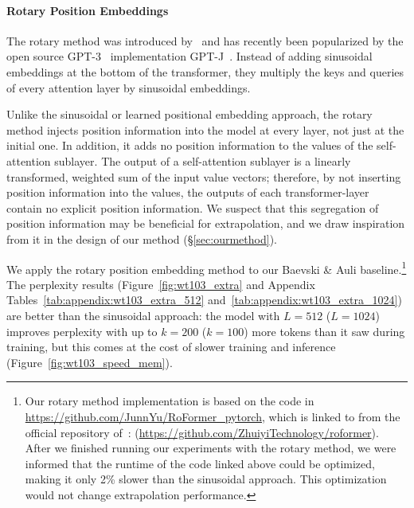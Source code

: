 \paragraph{Rotary Position Embeddings}
The rotary method was introduced by~\cite{roformer} and has recently been popularized by the open source GPT-3~\citep{gpt3} implementation GPT-J~\citep{gpt-j}. Instead of adding sinusoidal embeddings at the bottom of the transformer, they multiply the keys and queries of every attention layer by sinusoidal embeddings. 

Unlike the sinusoidal or learned positional embedding approach, the rotary method injects position information into the model at every layer, not just at the initial one.  In addition, it adds no position information to the values of the self-attention sublayer. The output of a self-attention sublayer is a linearly transformed, weighted sum of the input value vectors; therefore, by not inserting position information into the values, the outputs of each transformer-layer contain no explicit position information. 
We suspect that this segregation of position information may be beneficial for extrapolation, and we draw inspiration from it in the design of our method (\S\ref{sec:ourmethod}).

We apply the rotary position embedding method to our Baevski \& Auli baseline.\footnote{Our rotary method implementation is based on the code in \url{https://github.com/JunnYu/RoFormer_pytorch}, which is linked to from the official repository of~\cite{roformer}: (\url{https://github.com/ZhuiyiTechnology/roformer}). After we finished running our experiments with the rotary method, we were informed that the runtime of the code linked above could be optimized, making it only 2\% slower than the sinusoidal approach. This optimization would not change extrapolation performance.}
The perplexity results (Figure~\ref{fig:wt103_extra} and Appendix Tables~\ref{tab:appendix:wt103_extra_512} and~\ref{tab:appendix:wt103_extra_1024}) are better than the sinusoidal approach: the model with $L=512$ ($L=1024$) improves perplexity with up to $k=200$ ($k=100$) more tokens than it saw during training, but this comes at the cost of slower training and inference (Figure~\ref{fig:wt103_speed_mem}). %

